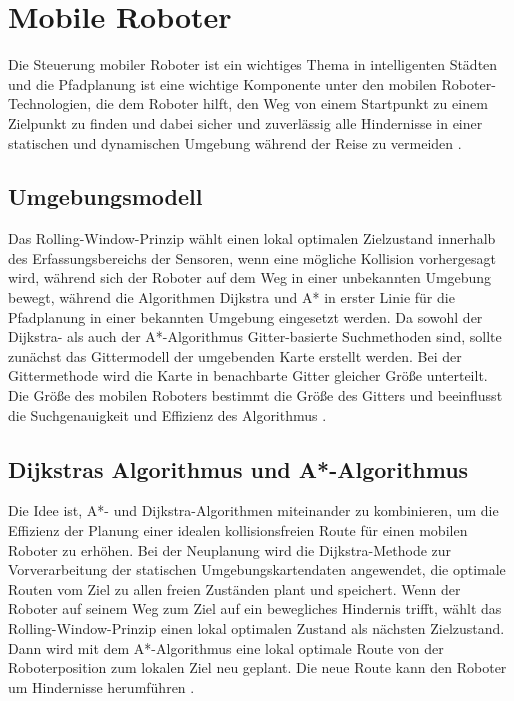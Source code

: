 \newpage
\section{Mobile Roboter}
\label{Mobile Roboter}
Die Steuerung mobiler Roboter ist ein wichtiges Thema in intelligenten Städten und die Pfadplanung ist eine wichtige Komponente unter den mobilen Roboter-Technologien, die dem Roboter hilft, den Weg von einem Startpunkt zu einem Zielpunkt zu finden und dabei sicher und zuverlässig alle Hindernisse in einer statischen und dynamischen Umgebung während der Reise zu vermeiden \cite{Myung21,Hong-mei17}.

\subsection{Umgebungsmodell}
Das Rolling-Window-Prinzip wählt einen lokal optimalen Zielzustand innerhalb des Erfassungsbereichs der Sensoren, wenn eine mögliche Kollision vorhergesagt wird, während sich der Roboter auf dem Weg in einer unbekannten Umgebung bewegt, während die Algorithmen Dijkstra und A* in erster Linie für die Pfadplanung in einer bekannten Umgebung eingesetzt werden.
\newline
Da sowohl der Dijkstra- als auch der A*-Algorithmus Gitter-basierte Suchmethoden sind, sollte zunächst das Gittermodell der umgebenden Karte erstellt werden. Bei der Gittermethode wird die Karte in benachbarte Gitter gleicher Größe unterteilt. 
Die Größe des mobilen Roboters bestimmt die Größe des Gitters und beeinflusst die Suchgenauigkeit und Effizienz des Algorithmus \cite{Hong-mei17}.

\subsection{Dijkstras Algorithmus und A*-Algorithmus}

Die Idee ist, A*- und Dijkstra-Algorithmen miteinander zu kombinieren, um die Effizienz der Planung einer idealen kollisionsfreien Route für einen mobilen Roboter zu erhöhen. Bei der Neuplanung wird die Dijkstra-Methode zur Vorverarbeitung der statischen Umgebungskartendaten angewendet, die optimale Routen vom Ziel zu allen freien Zuständen plant und speichert. Wenn der Roboter auf seinem Weg zum Ziel auf ein bewegliches Hindernis trifft, wählt das Rolling-Window-Prinzip einen lokal optimalen Zustand als nächsten Zielzustand. Dann wird mit dem A*-Algorithmus eine lokal optimale Route von der Roboterposition zum lokalen Ziel neu geplant.
Die neue Route kann den Roboter um Hindernisse herumführen \cite{Hong-mei17}.



